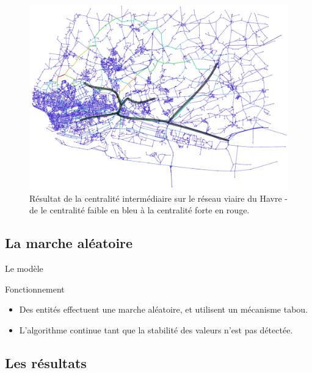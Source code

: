 \documentclass{beamer}
\begin{document}
\begin{frame}
	\begin{figure}[htbp]
		\centering
		\includegraphics[width=0.8\linewidth]{./img/centralite_inter_noweight_Le_Havre.pdf}
		\caption{Résultat de la centralité intermédiaire sur le réseau viaire du Havre - de le centralité faible en bleu à la centralité forte en rouge.}
		\label{fig:algo_brandes}
	\end{figure}
\end{frame}
	
	\subsection{La marche aléatoire}
	
\begin{frame}{Le modèle}
	\begin{block}{Fonctionnement}
	    \begin{itemize}
	        \item Des entités effectuent une marche aléatoire, et utilisent un mécanisme tabou.
	        \item L'algorithme continue tant que la stabilité des valeurs n'est pas détectée.
	    \end{itemize}
	\end{block}
\end{frame}

	\subsection{Les résultats}
	
\end{document}
